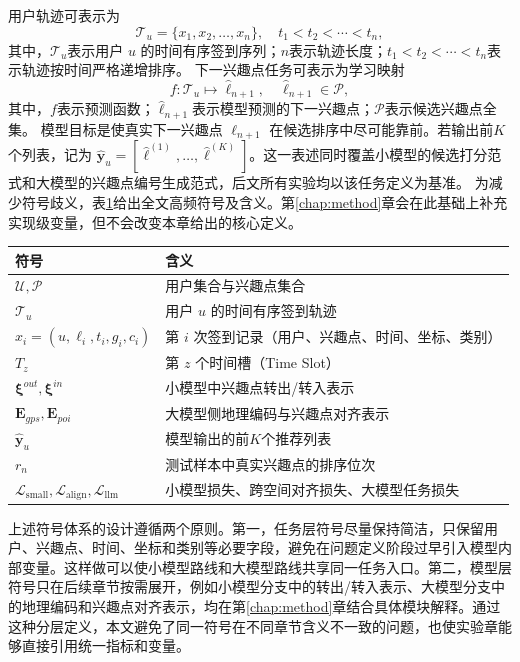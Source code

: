 用户轨迹可表示为
\begin{equation}
\mathcal{T}_u=\{x_1,x_2,\ldots,x_n\},\quad t_1<t_2<\cdots<t_n,
\label{eq:c2-traj}
\end{equation}
其中，$\mathcal{T}_u$表示用户 $u$ 的时间有序签到序列；$n$表示轨迹长度；$t_1<t_2<\cdots<t_n$表示轨迹按时间严格递增排序。
下一兴趣点任务可表示为学习映射
\begin{equation}
f:\mathcal{T}_u\mapsto \hat{\ell}_{n+1},\quad \hat{\ell}_{n+1}\in\mathcal{P},
\label{eq:c2-task}
\end{equation}
其中，$f$表示预测函数；$\hat{\ell}_{n+1}$表示模型预测的下一兴趣点；$\mathcal{P}$表示候选兴趣点全集。
模型目标是使真实下一兴趣点 $\ell_{n+1}$ 在候选排序中尽可能靠前。若输出前$K$个列表，记为 $\hat{\mathbf{y}}_u=[\hat{\ell}^{(1)},\ldots,\hat{\ell}^{(K)}]$。这一表述同时覆盖小模型的候选打分范式和大模型的兴趣点编号生成范式，后文所有实验均以该任务定义为基准。
为减少符号歧义，表\ref{tab:c2-notation}给出全文高频符号及含义。第\ref{chap:method}章会在此基础上补充实现级变量，但不会改变本章给出的核心定义。
\begin{table}[htbp]
    \cTwoTblStyle
    \label{tab:c2-notation}
    \begin{tabular}{p{}p{}}
        \toprule
        符号 & 含义 \\
        \midrule
        $\mathcal{U},\mathcal{P}$ & 用户集合与兴趣点集合 \\
        $\mathcal{T}_u$ & 用户 $u$ 的时间有序签到轨迹 \\
        $x_i=(u,\ell_i,t_i,g_i,c_i)$ & 第 $i$ 次签到记录（用户、兴趣点、时间、坐标、类别） \\
        $T_z$ & 第 $z$ 个时间槽（Time Slot） \\
        $\boldsymbol{\xi}^{out},\boldsymbol{\xi}^{in}$ & 小模型中兴趣点转出/转入表示 \\
        $\mathbf{E}_{gps},\mathbf{E}_{poi}$ & 大模型侧地理编码与兴趣点对齐表示 \\
        $\hat{\mathbf{y}}_u$ & 模型输出的前$K$个推荐列表 \\
        $r_n$ & 测试样本中真实兴趣点的排序位次 \\
        $\mathcal{L}_{\text{small}},\mathcal{L}_{\text{align}},\mathcal{L}_{\text{llm}}$ & 小模型损失、跨空间对齐损失、大模型任务损失 \\
        \bottomrule
    \end{tabular}
\end{table}
上述符号体系的设计遵循两个原则。第一，任务层符号尽量保持简洁，只保留用户、兴趣点、时间、坐标和类别等必要字段，避免在问题定义阶段过早引入模型内部变量。这样做可以使小模型路线和大模型路线共享同一任务入口。第二，模型层符号只在后续章节按需展开，例如小模型分支中的转出/转入表示、大模型分支中的地理编码和兴趣点对齐表示，均在第\ref{chap:method}章结合具体模块解释。通过这种分层定义，本文避免了同一符号在不同章节含义不一致的问题，也使实验章能够直接引用统一指标和变量。

